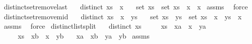 \begin{isabellebody}
%
\endisadelimproof
\isanewline
{}\isamarkupfalse%
\ distinct{\isacharunderscore}set{\isacharunderscore}remove{\isacharunderscore}last{\isacharcolon}\isanewline
\ \ \ {\isachardoublequoteopen}distinct\ {\isacharparenleft}xs\ {\isacharat}\ {\isacharbrackleft}x{\isacharbrackright}{\isacharparenright}{\isachardoublequoteclose}\isanewline
\ \ \ {\isachardoublequoteopen}set\ xs\ {\isacharequal}\ set\ {\isacharparenleft}xs\ {\isacharat}\ {\isacharbrackleft}x{\isacharbrackright}{\isacharparenright}\ {\isacharminus}\ {\isacharbraceleft}x{\isacharbraceright}{\isachardoublequoteclose}\isanewline
%
\isadelimproof
%
\endisadelimproof
%
\isatagproof
{}\isamarkupfalse%
\ assms\ \isamarkupfalse%
\ force%
\endisatagproof
{\isafoldproof}%
%
\isadelimproof
\isanewline
%
\endisadelimproof
\isanewline
{}\isamarkupfalse%
\ distinct{\isacharunderscore}set{\isacharunderscore}remove{\isacharunderscore}mid{\isacharcolon}\isanewline
\ \ \ {\isachardoublequoteopen}distinct\ {\isacharparenleft}xs\ {\isacharat}\ {\isacharbrackleft}x{\isacharbrackright}\ {\isacharat}\ ys{\isacharparenright}{\isachardoublequoteclose}\isanewline
\ \ \ {\isachardoublequoteopen}set\ {\isacharparenleft}xs\ {\isacharat}\ ys{\isacharparenright}\ {\isacharequal}\ set\ {\isacharparenleft}xs\ {\isacharat}\ {\isacharbrackleft}x{\isacharbrackright}\ {\isacharat}\ ys{\isacharparenright}\ {\isacharminus}\ {\isacharbraceleft}x{\isacharbraceright}{\isachardoublequoteclose}\isanewline
%
\isadelimproof
%
\endisadelimproof
%
\isatagproof
{}\isamarkupfalse%
\ assms\ \isamarkupfalse%
\ force%
\endisatagproof
{\isafoldproof}%
%
\isadelimproof
\isanewline
%
\endisadelimproof
\isanewline
{}\isamarkupfalse%
\ distinct{\isacharunderscore}list{\isacharunderscore}split{\isacharcolon}\isanewline
\ \ \ {\isachardoublequoteopen}distinct\ xs{\isachardoublequoteclose}\isanewline
\ \ \ \ \ {\isachardoublequoteopen}xs\ {\isacharequal}\ xa\ {\isacharat}\ x\ {\isacharhash}\ ya{\isachardoublequoteclose}\isanewline
\ \ \ \ \ {\isachardoublequoteopen}xs\ {\isacharequal}\ xb\ {\isacharat}\ x\ {\isacharhash}\ yb{\isachardoublequoteclose}\isanewline
\ \ \ {\isachardoublequoteopen}xa\ {\isacharequal}\ xb\ {\isasymand}\ ya\ {\isacharequal}\ yb{\isachardoublequoteclose}\isanewline
%
\isadelimproof
%
\endisadelimproof
%
\isatagproof
{}\isamarkupfalse%
\ assms\ \isamarkupfalse%

\end{isabellebody}
